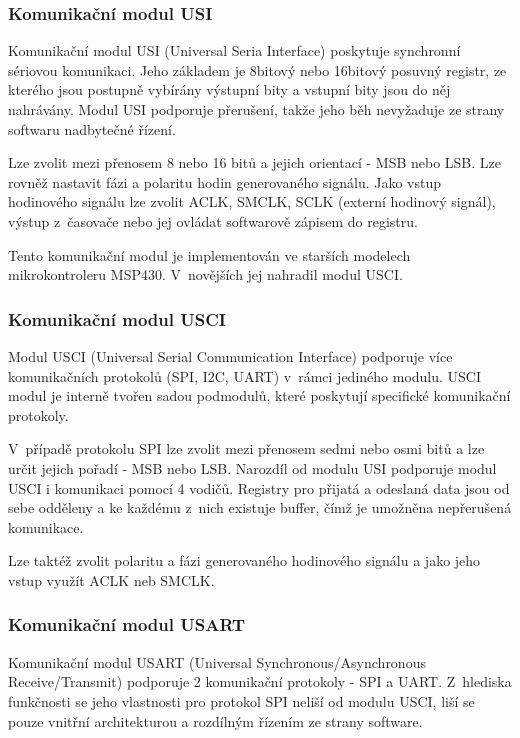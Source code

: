 \subsubsection{Komunikační modul USI}

Komunikační modul USI (Universal Seria Interface) poskytuje synchronní sériovou komunikaci. Jeho základem je 8bitový nebo 16bitový posuvný registr, ze kterého jsou postupně vybírány výstupní bity a vstupní bity jsou do něj nahrávány. Modul USI podporuje přerušení, takže jeho běh nevyžaduje ze strany softwaru nadbytečné řízení.

Lze zvolit mezi přenosem 8 nebo 16 bitů a jejich orientací - MSB nebo LSB. Lze rovněž nastavit fázi a polaritu hodin generovaného signálu. Jako vstup hodinového signálu lze zvolit ACLK, SMCLK, SCLK (externí hodinový signál), výstup z~časovače nebo jej ovládat softwarově zápisem do registru.

Tento komunikační modul je implementován ve starších modelech mikrokontroleru MSP430. V~novějších jej nahradil modul USCI.

\subsubsection{Komunikační modul USCI}

Modul USCI (Universal Serial Communication Interface) podporuje více komunikačních protokolů (SPI, I2C, UART) v~rámci jediného modulu. USCI modul je interně tvořen sadou podmodulů, které poskytují specifické komunikační protokoly.

V~případě protokolu SPI lze zvolit mezi přenosem sedmi nebo osmi bitů a lze určit jejich pořadí - MSB nebo LSB. Narozdíl od modulu USI podporuje modul USCI i komunikaci pomocí 4 vodičů. Registry pro přijatá a odeslaná data jsou od sebe odděleny a ke každému z~nich existuje buffer, čímž je umožněna nepřerušená komunikace.

Lze taktéž zvolit polaritu a fázi generovaného hodinového signálu a jako jeho vstup využít ACLK neb SMCLK.

\subsubsection{Komunikační modul USART}

Komunikační modul USART (Universal Synchronous/Asynchronous Receive/Transmit) podporuje 2 komunikační protokoly - SPI a UART. Z~hlediska funkčnosti se jeho vlastnosti pro protokol SPI neliší od modulu USCI, liší se pouze vnitřní architekturou a rozdílným řízením ze strany software.


